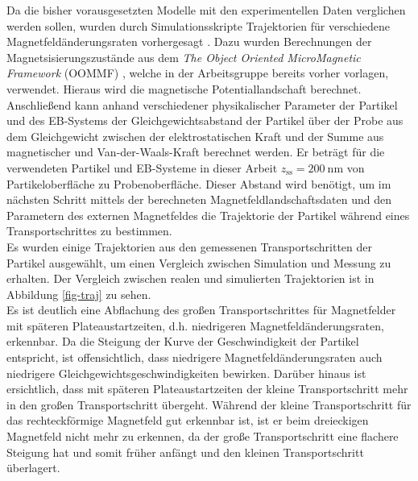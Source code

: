 \documentclass[page,pdftex,12pt,a4paper,twoside,openright]{scrbook}
\begin{document}
Da die bisher vorausgesetzten Modelle mit den experimentellen Daten verglichen werden sollen, wurden durch Simulationsskripte Trajektorien für verschiedene Magnetfeldänderungsraten vorhergesagt \cite{holzinger_pythonscript_nodate}. Dazu wurden Berechnungen der Magnetsisierungszustände aus dem \emph{The Object Oriented MicroMagnetic Framework} (OOMMF) \cite{donahue_oommf_1999}, welche in der Arbeitsgruppe bereits vorher vorlagen, verwendet. Hieraus wird die magnetische Potentiallandschaft berechnet. Anschließend kann anhand verschiedener physikalischer Parameter der Partikel und des EB-Systems der Gleichgewichtsabstand der Partikel über der Probe aus dem Gleichgewicht zwischen der elektrostatischen Kraft und der Summe aus magnetischer und Van-der-Waals-Kraft berechnet werden. Er beträgt für die verwendeten Partikel und EB-Systeme in dieser Arbeit \(z_\mathrm{ss} = \SI{200}{\nano\meter}\) von Partikeloberfläche zu Probenoberfläche. Dieser Abstand wird benötigt, um im nächsten Schritt mittels der berechneten Magnetfeldlandschaftsdaten und den Parametern des externen Magnetfeldes die Trajektorie der Partikel während eines Transportschrittes zu bestimmen.\\


Es wurden einige Trajektorien aus den gemessenen Transportschritten der Partikel ausgewählt, um einen Vergleich zwischen Simulation und Messung zu erhalten. Der Vergleich zwischen realen und simulierten Trajektorien ist in Abbildung \ref{fig-traj} zu sehen.\\

Es ist deutlich eine Abflachung des großen Transportschrittes für Magnetfelder mit späteren Plateaustartzeiten, d.h. niedrigeren Magnetfeldänderungsraten, erkennbar. Da die Steigung der Kurve der Geschwindigkeit der Partikel entspricht, ist offensichtlich, dass niedrigere Magnetfeldänderungsraten auch niedrigere Gleichgewichtsgeschwindigkeiten bewirken. Darüber hinaus ist ersichtlich, dass mit späteren Plateaustartzeiten der kleine Transportschritt mehr in den großen Transportschritt übergeht. Während der kleine Transportschritt für das rechteckförmige Magnetfeld gut erkennbar ist, ist er beim dreieckigen Magnetfeld nicht mehr zu erkennen, da der große Transportschritt eine flachere Steigung hat und somit früher anfängt und den kleinen Transportschritt überlagert.\\
\end{document}
